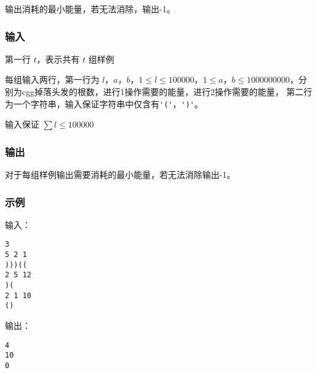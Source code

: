 输出消耗的最小能量，若无法消除，输出-1。

\subsubsection{输入}
第一行 $t$，表示共有 $t$ 组样例

每组输入两行，第一行为 $l$，$a$，$b$，$1 \leq l \leq 100000$，$1 \leq a$，$b \leq
1000000000$，分别为cgg掉落头发的根数，进行1操作需要的能量，进行2操作需要的能量，
第二行为一个字符串，输入保证字符串中仅含有\verb|'('|，\verb|')'|。

输入保证 $\sum l \leq 100000$

\subsubsection{输出}
对于每组样例输出需要消耗的最小能量，若无法消除输出-1。

\subsubsection{示例}
输入：
\begin{lstlisting}
3
5 2 1
)))((
2 5 12
)(
2 1 10
()
\end{lstlisting}

输出：
\begin{lstlisting}
4
10
0
\end{lstlisting}

